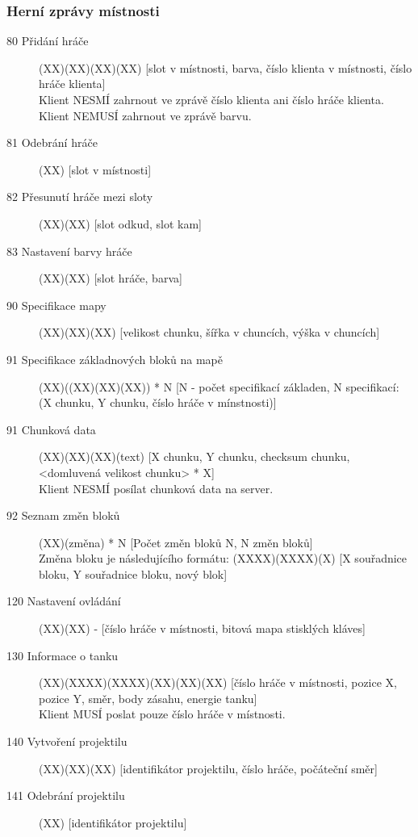 \documentclass[12pt,a4paper]{article}
\begin{document}
\subsubsection*{Herní zprávy místnosti}
\begin{description}
\item[80 Přidání hráče] (XX)(XX)(XX)(XX) [slot v místnosti, barva, číslo klienta v místnosti, číslo hráče klienta] \\
Klient NESMÍ zahrnout ve zprávě číslo klienta ani číslo hráče klienta. Klient NEMUSÍ zahrnout ve zprávě barvu.
\item[81 Odebrání hráče] (XX) [slot v místnosti]
\item[82 Přesunutí hráče mezi sloty] (XX)(XX) [slot odkud, slot kam]
\item[83 Nastavení barvy hráče] (XX)(XX) [slot hráče, barva]

\item[90 Specifikace mapy] (XX)(XX)(XX) [velikost chunku, šířka v chuncích, výška v chuncích]
\item[91 Specifikace základnových bloků na mapě] (XX)((XX)(XX)(XX)) * N [N - počet specifikací základen, N specifikací: (X chunku, Y chunku, číslo hráče v mínstnosti)]
\item[91 Chunková data] (XX)(XX)(XX)(text) [X chunku, Y chunku, checksum chunku, <domluvená velikost chunku> * X]\\
Klient NESMÍ posílat chunková data na server.
\item[92 Seznam změn bloků] (XX)(změna) * N [Počet změn bloků N, N změn bloků]\\ 
Změna bloku je následujícího formátu: (XXXX)(XXXX)(X) [X souřadnice bloku, Y souřadnice bloku, nový blok]

\item[120 Nastavení ovládání] (XX)(XX) - [číslo hráče v místnosti, bitová mapa stisklých kláves]
\item[130 Informace o tanku] (XX)(XXXX)(XXXX)(XX)(XX)(XX) [číslo hráče v místnosti, pozice X, pozice Y, směr, body zásahu, energie tanku] \\
Klient MUSÍ poslat pouze číslo hráče v místnosti.
\item[140 Vytvoření projektilu] (XX)(XX)(XX) [identifikátor projektilu, číslo hráče, počáteční směr]
\item[141 Odebrání projektilu] (XX) [identifikátor projektilu]
\end{description}




\end{document}
